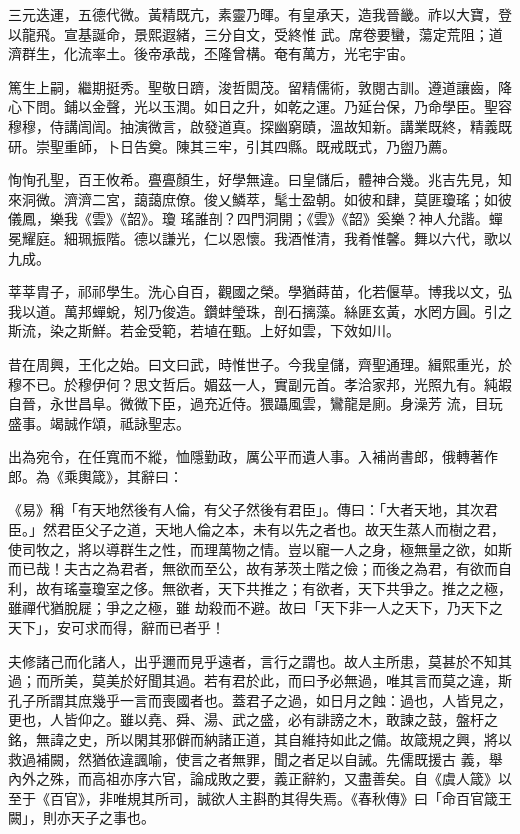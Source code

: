 \begin{pinyinscope}
 三元迭運，五德代微。黃精既亢，素靈乃暉。有皇承天，造我晉畿。祚以大寶，登以龍飛。宣基誕命，景熙遐緒，三分自文，受終惟
 武。席卷要蠻，蕩定荒阻；道濟群生，化流率土。後帝承哉，丕隆曾構。奄有萬方，光宅宇宙。



 篤生上嗣，繼期挺秀。聖敬日躋，浚哲閎茂。留精儒術，敦閱古訓。遵道讓齒，降心下問。鋪以金聲，光以玉潤。如日之升，如乾之運。乃延台保，乃命學臣。聖容穆穆，侍講訚訚。抽演微言，啟發道真。探幽窮賾，溫故知新。講業既終，精義既研。崇聖重師，卜日告奠。陳其三牢，引其四縣。既戒既式，乃盥乃薦。



 恂恂孔聖，百王攸希。亹亹顏生，好學無違。曰皇儲后，體神合幾。兆吉先見，知來洞微。濟濟二宮，藹藹庶僚。俊乂鱗萃，髦士盈朝。如彼和肆，莫匪瓊瑤；如彼儀鳳，樂我《雲》《韶》。瓊
 瑤誰剖？四門洞開；《雲》《韶》奚樂？神人允諧。蟬冕耀庭。細珮振階。德以謙光，仁以恩懷。我酒惟清，我肴惟馨。舞以六代，歌以九成。



 莘莘胄子，祁祁學生。洗心自百，觀國之榮。學猶蒔苗，化若偃草。博我以文，弘我以道。萬邦蟬蛻，矧乃俊造。鑽蚌瑩珠，剖石摛藻。絲匪玄黃，水罔方圓。引之斯流，染之斯鮮。若金受範，若埴在甄。上好如雲，下效如川。



 昔在周興，王化之始。曰文曰武，時惟世子。今我皇儲，齊聖通理。緝熙重光，於穆不已。於穆伊何？思文哲后。媚茲一人，實副元首。孝洽家邦，光照九有。純嘏自晉，永世昌阜。微微下臣，過充近侍。猥躡風雲，鸞龍是廁。身澡芳
 流，目玩盛事。竭誠作頌，祗詠聖志。



 出為宛令，在任寬而不縱，恤隱勤政，厲公平而遺人事。入補尚書郎，俄轉著作郎。為《乘輿箴》，其辭曰：



 《易》稱「有天地然後有人倫，有父子然後有君臣」。傳曰：「大者天地，其次君臣。」然君臣父子之道，天地人倫之本，未有以先之者也。故天生蒸人而樹之君，使司牧之，將以導群生之性，而理萬物之情。豈以寵一人之身，極無量之欲，如斯而已哉！夫古之為君者，無欲而至公，故有茅茨土階之儉；而後之為君，有欲而自利，故有瑤臺瓊室之侈。無欲者，天下共推之；有欲者，天下共爭之。推之之極，雖禪代猶脫屣；爭之之極，雖
 劫殺而不避。故曰「天下非一人之天下，乃天下之天下」，安可求而得，辭而已者乎！



 夫修諸己而化諸人，出乎邇而見乎遠者，言行之謂也。故人主所患，莫甚於不知其過；而所美，莫美於好聞其過。若有君於此，而曰予必無過，唯其言而莫之違，斯孔子所謂其庶幾乎一言而喪國者也。蓋君子之過，如日月之蝕：過也，人皆見之，更也，人皆仰之。雖以堯、舜、湯、武之盛，必有誹謗之木，敢諫之鼓，盤杅之銘，無諱之史，所以閑其邪僻而納諸正道，其自維持如此之備。故箴規之興，將以救過補闕，然猶依違諷喻，使言之者無罪，聞之者足以自誡。先儒既援古
 義，舉內外之殊，而高祖亦序六官，論成敗之要，義正辭約，又盡善矣。自《虞人箴》以至于《百官》，非唯規其所司，誠欲人主斟酌其得失焉。《春秋傳》曰「命百官箴王闕」，則亦天子之事也。




\end{pinyinscope}
